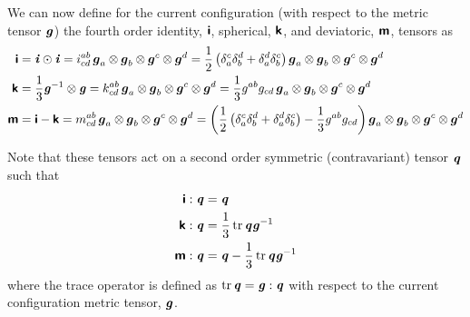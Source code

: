 We can now define for the current configuration (\ie with respect to the
metric tensor $\boldsymbol{\mathit{g}}$) the fourth order identity,
$\boldsymbol{\mathsf{i}}$, spherical, $\boldsymbol{\mathsf{k}}$, and deviatoric,
$\boldsymbol{\mathsf{m}}$, tensors as
\begin{align}
  \boldsymbol{\mathsf{i}}&=  \boldsymbol{\mathit{i}} \odot \boldsymbol{\mathit{i}} =
  i^{ab}_{cd}\, \boldsymbol{g}_{a} \otimes \boldsymbol{g}_{b} \otimes \boldsymbol{g}^{c} \otimes \boldsymbol{g}^{d} =
  \dfrac{1}{2}\left(  \delta_{a}^{c}  \delta_{b}^{d} + \delta_{a}^{d}  \delta_{b}^{c}  \right) \boldsymbol{g}_{a} \otimes \boldsymbol{g}_{b} \otimes \boldsymbol{g}^{c} \otimes \boldsymbol{g}^{d} 
  \\ \boldsymbol{\mathsf{k}}&=
  \dfrac{1}{3} {\boldsymbol{\mathit{g}}}^{-1} \otimes \boldsymbol{\mathit{g}} =
  k^{ab}_{cd}\, \boldsymbol{g}_{a} \otimes \boldsymbol{g}_{b} \otimes \boldsymbol{g}^{c} \otimes \boldsymbol{g}^{d} =
  \dfrac{1}{3}g^{ab}g_{cd}\, \boldsymbol{g}_{a} \otimes \boldsymbol{g}_{b} \otimes \boldsymbol{g}^{c} \otimes \boldsymbol{g}^{d} \\ \boldsymbol{\mathsf{m}}&=
  \boldsymbol{\mathsf{i}}-\boldsymbol{\mathsf{k}}=
  m^{ab}_{cd}\, \boldsymbol{g}_{a} \otimes \boldsymbol{g}_{b} \otimes \boldsymbol{g}^{c} \otimes \boldsymbol{g}^{d} =
  \left( \dfrac{1}{2}\left(  \delta_{a}^{c}  \delta_{b}^{d} + \delta_{a}^{d}  \delta_{b}^{c}  \right)-\dfrac{1}{3}g^{ab}g_{cd} \right) \boldsymbol{g}_{a} \otimes \boldsymbol{g}_{b} \otimes \boldsymbol{g}^{c} \otimes \boldsymbol{g}^{d} 
\end{align}

Note that these tensors act on a second order symmetric (contravariant) tensor $\boldsymbol{\mathit{q}}$
such that
\begin{align}
  \boldsymbol{\mathsf{i}}:\boldsymbol{\mathit{q}}&=\boldsymbol{\mathit{q}} \\
  \boldsymbol{\mathsf{k}}:\boldsymbol{\mathit{q}}&=\dfrac{1}{3}\operatorname{tr}\boldsymbol{\mathit{q}}{\boldsymbol{\mathit{g}}}^{-1} \\
  \boldsymbol{\mathsf{m}}:\boldsymbol{\mathit{q}}&=\boldsymbol{\mathit{q}}-\dfrac{1}{3}\operatorname{tr}\boldsymbol{\mathit{q}}{\boldsymbol{\mathit{g}}}^{-1}
\end{align}
where the trace operator is defined as $\operatorname{tr}\boldsymbol{\mathit{q}}=\boldsymbol{\mathit{g}}:\boldsymbol{\mathit{q}}$ \ie
with respect to the current configuration metric tensor, $\boldsymbol{\mathit{g}}$.

